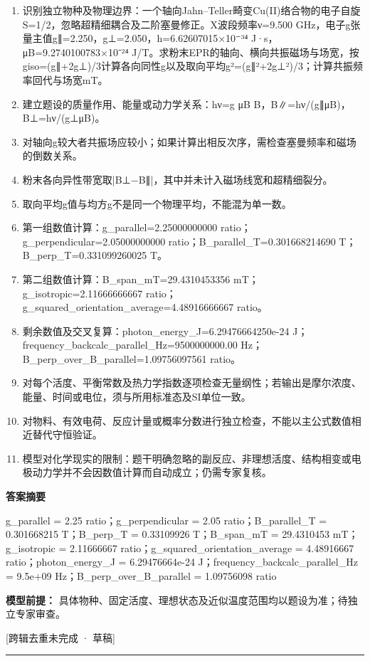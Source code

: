 \documentclass[UTF8,11pt,a4paper]{ctexart}
\begin{document}
\begin{enumerate}
\item 识别独立物种及物理边界：一个轴向Jahn–Teller畸变Cu(II)络合物的电子自旋S=1/2，忽略超精细耦合及二阶塞曼修正。X波段频率ν=9.500 GHz，电子g张量主值g∥=2.250，g⊥=2.050，h=6.62607015×10⁻³⁴ J·s，μB=9.2740100783×10⁻²⁴ J/T。求粉末EPR的轴向、横向共振磁场与场宽，按giso=(g∥+2g⊥)/3计算各向同性g以及取向平均g²=(g∥²+2g⊥²)/3；计算共振频率回代与场宽mT。
\item 建立题设的质量作用、能量或动力学关系：hν=g μB B，B∥=hν/(g∥μB)，B⊥=hν/(g⊥μB)。
\item 对轴向g较大者共振场应较小；如果计算出相反次序，需检查塞曼频率和磁场的倒数关系。
\item 粉末各向异性带宽取|B⊥−B∥|，其中并未计入磁场线宽和超精细裂分。
\item 取向平均g值与均方g不是同一个物理平均，不能混为单一数。
\item 第一组数值计算：g\_parallel=2.25000000000 ratio；g\_perpendicular=2.05000000000 ratio；B\_parallel\_T=0.301668214690 T；B\_perp\_T=0.331099260025 T。
\item 第二组数值计算：B\_span\_mT=29.4310453356 mT；g\_isotropic=2.11666666667 ratio；g\_squared\_orientation\_average=4.48916666667 ratio。
\item 剩余数值及交叉复算：photon\_energy\_J=6.29476664250e-24 J；frequency\_backcalc\_parallel\_Hz=9500000000.00 Hz；B\_perp\_over\_B\_parallel=1.09756097561 ratio。
\item 对每个活度、平衡常数及热力学指数逐项检查无量纲性；若输出是摩尔浓度、能量、时间或电位，须与所用标准态及SI单位一致。
\item 对物料、有效电荷、反应计量或概率分数进行独立检查，不能以主公式数值相近替代守恒验证。
\item 模型对化学现实的限制：题干明确忽略的副反应、非理想活度、结构相变或电极动力学并不会因数值计算而自动成立；仍需专家复核。
\end{enumerate}
\noindent\textbf{答案摘要}\par
g\_parallel = 2.25 ratio；g\_perpendicular = 2.05 ratio；B\_parallel\_T = 0.301668215 T；B\_perp\_T = 0.33109926 T；B\_span\_mT = 29.4310453 mT；g\_isotropic = 2.11666667 ratio；g\_squared\_orientation\_average = 4.48916667 ratio；photon\_energy\_J = 6.29476664e-24 J；frequency\_backcalc\_parallel\_Hz = 9.5e+09 Hz；B\_perp\_over\_B\_parallel = 1.09756098 ratio\par
\noindent\textbf{模型前提：}
具体物种、固定活度、理想状态及近似温度范围均以题设为准；待独立专家审查。\par
\noindent\textcolor{red!65!black}{[跨辑去重未完成 · 草稿]} \par
\medskip\hrule\medskip
{}
\end{document}

